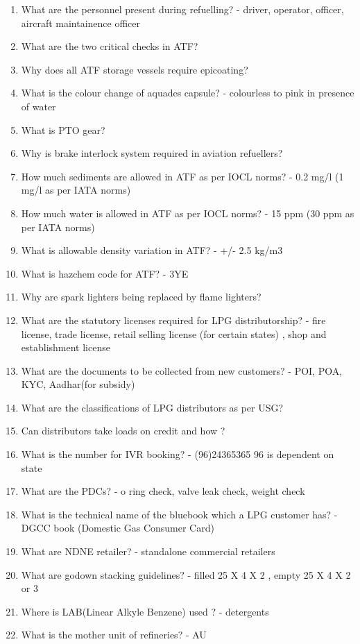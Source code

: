 \documentclass{report}
\begin{document}
\begin{enumerate}
		\item What are the personnel present during refuelling? - driver, operator, officer, aircraft maintainence officer
		\item What are the two critical checks in ATF?
		\item Why does all ATF storage vessels require epicoating?
		\item What is the colour change of aquades capsule? - colourless to pink in presence of water
		\item What is PTO gear?
		\item Why is brake interlock system required in aviation refuellers?
		\item How much sediments are allowed in ATF as per IOCL norms? - 0.2 mg/l (1 mg/l as per IATA norms)
		\item How much water is allowed in ATF as per IOCL norms? - 15 ppm (30 ppm as per IATA norms)
		\item What is allowable density variation in ATF?  -  +/- 2.5 kg/m3
		\item What is hazchem code for ATF? - 3YE
		\item Why are spark lighters being replaced by flame lighters?
		\item What are the statutory licenses required for LPG distributorship? - fire license, trade license, retail selling license (for certain states) , shop and establishment license
		\item What are the documents to be collected from new customers? - POI, POA, KYC, Aadhar(for subsidy)
		\item What are the classifications of LPG distributors as per USG?
		\item Can distributors take loads on credit and how ?
		\item What is the number for IVR booking? - (96)24365365  96 is dependent on state
		\item What are the PDCs? - o ring check, valve leak check, weight check
		\item What is the technical name of the bluebook which a LPG customer has? - DGCC book (Domestic Gas Consumer Card)
		\item What are NDNE retailer? - standalone commercial retailers
		\item What are godown stacking guidelines? - filled 25 X 4 X 2 , empty 25 X 4 X 2 or 3
		\item Where is LAB(Linear Alkyle Benzene) used ? - detergents
		\item What is the mother unit of refineries? - AU

\end{enumerate}
\end{document}
